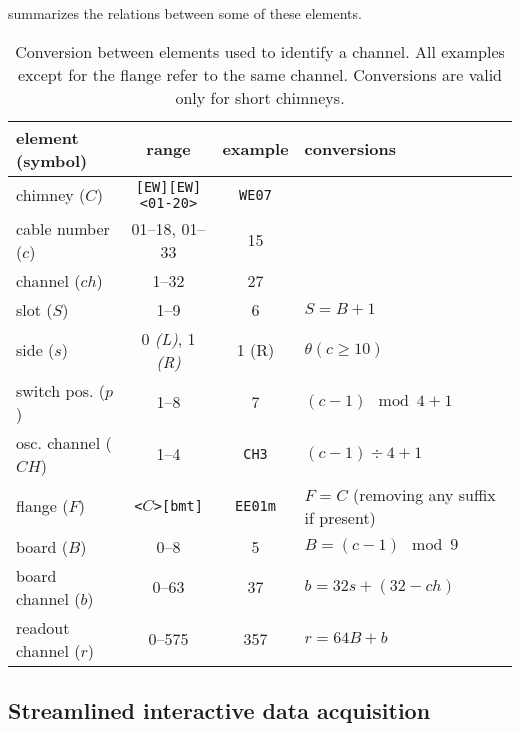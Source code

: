  summarizes the relations between some of these elements.

\begin{table}
  {
    \small
    \begin{tabular}{|l|c|c|l|}
      \hline
      element    (symbol)   & range                                       & example        & conversions \\
      \hline
      chimney       ($C$)   & \texttt{[EW]}\texttt{[EW]}\texttt{<01-20>}  & \texttt{WE07}  & \\
      cable number  ($c$)   & 01--18, 01--33                              & 15             & \\
      channel       ($ch$)  & 1--32                                       & 27             & \\
      \hline
      slot          ($S$)   & 1--9                                        & 6              & $S = B + 1$ \\
      side          ($s$)   & 0 \emph{(L)}, 1 \emph{(R)}                  & 1 (R)          & $\theta\left(c \geq 10\right)$ \\ 
      switch pos.   ($p$)   & 1--8                                        & 7              & $(c - 1) \mod 4 + 1$ \\
      osc. channel  ($CH$)  & 1--4                                        & \texttt{CH3}   & $(c - 1) \div 4 + 1$ \\
      \hline
      flange        ($F$)   & \texttt{<$C$>}\texttt{[bmt]}                & \texttt{EE01m} & $F = C$ (removing any suffix if present) \\
      board         ($B$)   & 0--8                                        & 5              & $B = (c - 1) \mod 9$ \\
      board channel ($b$)   & 0--63                                       & 37             & $b = 32 s + (32 - ch)$ \\
      readout channel ($r$) & 0--575                                      & 357            & $r = 64 B + b$ \\
      \hline
    \end{tabular}
  }
  \label{table:NotationConversion}
  \caption{
    Conversion between elements used to identify a channel.
    All examples except for the flange refer to the same channel.
    Conversions are valid only for short chimneys.
  }
\end{table}


\subsection{Streamlined interactive data acquisition}
\label{ssec:software:streamlinedDAQ}

